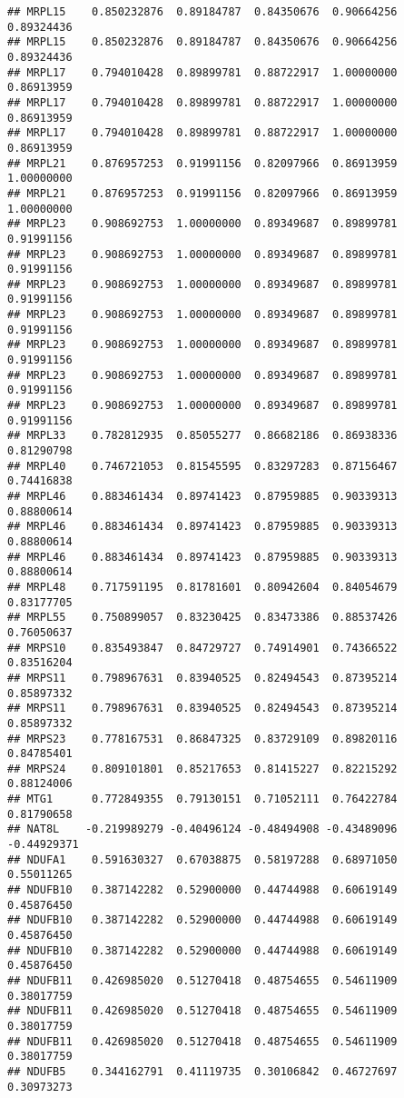 \documentclass[
]{article}
\begin{document}
\begin{verbatim}
## MRPL15    0.850232876  0.89184787  0.84350676  0.90664256  0.89324436
## MRPL15    0.850232876  0.89184787  0.84350676  0.90664256  0.89324436
## MRPL17    0.794010428  0.89899781  0.88722917  1.00000000  0.86913959
## MRPL17    0.794010428  0.89899781  0.88722917  1.00000000  0.86913959
## MRPL17    0.794010428  0.89899781  0.88722917  1.00000000  0.86913959
## MRPL21    0.876957253  0.91991156  0.82097966  0.86913959  1.00000000
## MRPL21    0.876957253  0.91991156  0.82097966  0.86913959  1.00000000
## MRPL23    0.908692753  1.00000000  0.89349687  0.89899781  0.91991156
## MRPL23    0.908692753  1.00000000  0.89349687  0.89899781  0.91991156
## MRPL23    0.908692753  1.00000000  0.89349687  0.89899781  0.91991156
## MRPL23    0.908692753  1.00000000  0.89349687  0.89899781  0.91991156
## MRPL23    0.908692753  1.00000000  0.89349687  0.89899781  0.91991156
## MRPL23    0.908692753  1.00000000  0.89349687  0.89899781  0.91991156
## MRPL23    0.908692753  1.00000000  0.89349687  0.89899781  0.91991156
## MRPL33    0.782812935  0.85055277  0.86682186  0.86938336  0.81290798
## MRPL40    0.746721053  0.81545595  0.83297283  0.87156467  0.74416838
## MRPL46    0.883461434  0.89741423  0.87959885  0.90339313  0.88800614
## MRPL46    0.883461434  0.89741423  0.87959885  0.90339313  0.88800614
## MRPL46    0.883461434  0.89741423  0.87959885  0.90339313  0.88800614
## MRPL48    0.717591195  0.81781601  0.80942604  0.84054679  0.83177705
## MRPL55    0.750899057  0.83230425  0.83473386  0.88537426  0.76050637
## MRPS10    0.835493847  0.84729727  0.74914901  0.74366522  0.83516204
## MRPS11    0.798967631  0.83940525  0.82494543  0.87395214  0.85897332
## MRPS11    0.798967631  0.83940525  0.82494543  0.87395214  0.85897332
## MRPS23    0.778167531  0.86847325  0.83729109  0.89820116  0.84785401
## MRPS24    0.809101801  0.85217653  0.81415227  0.82215292  0.88124006
## MTG1      0.772849355  0.79130151  0.71052111  0.76422784  0.81790658
## NAT8L    -0.219989279 -0.40496124 -0.48494908 -0.43489096 -0.44929371
## NDUFA1    0.591630327  0.67038875  0.58197288  0.68971050  0.55011265
## NDUFB10   0.387142282  0.52900000  0.44744988  0.60619149  0.45876450
## NDUFB10   0.387142282  0.52900000  0.44744988  0.60619149  0.45876450
## NDUFB10   0.387142282  0.52900000  0.44744988  0.60619149  0.45876450
## NDUFB11   0.426985020  0.51270418  0.48754655  0.54611909  0.38017759
## NDUFB11   0.426985020  0.51270418  0.48754655  0.54611909  0.38017759
## NDUFB11   0.426985020  0.51270418  0.48754655  0.54611909  0.38017759
## NDUFB5    0.344162791  0.41119735  0.30106842  0.46727697  0.30973273

\end{verbatim}
\end{document}
